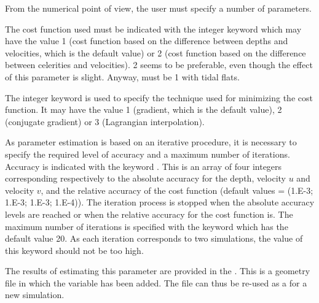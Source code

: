 From the numerical point of view, the user must specify a number of parameters.

The cost function used must be indicated with the integer keyword
 which may have the value 1 (cost function based on the
difference between depths and velocities, which is the default value)
or 2 (cost function based on the difference between celerities and velocities).
2 seems to be preferable, even though the effect of this parameter is slight.
Anyway,  must be 1 with tidal flats.

The integer keyword  is used to specify
the technique used for minimizing the cost function.
It may have the value 1 (gradient, which is the default value), 2 (conjugate
gradient) or 3 (Lagrangian interpolation).

As parameter estimation is based on an iterative procedure, it is necessary to
specify the required level of accuracy and a maximum number of iterations.
Accuracy is indicated with the keyword .
This is an array of four integers corresponding respectively to the absolute
accuracy for the depth, velocity $u$ and velocity $v$, and the relative accuracy
of the cost function (default values = (1.E-3; 1.E-3; 1.E-3; 1.E-4)).
The iteration process is stopped when the absolute accuracy levels are reached
or when the relative accuracy for the cost function is.
The maximum number of iterations is specified with the keyword
 which has the default
value 20.
As each iteration corresponds to two simulations,
the value of this keyword should not be too high.

The results of estimating this parameter are provided in the
.
This is a geometry file in which the  variable has been added.
The file can thus be re-used as a  for a new simulation.
